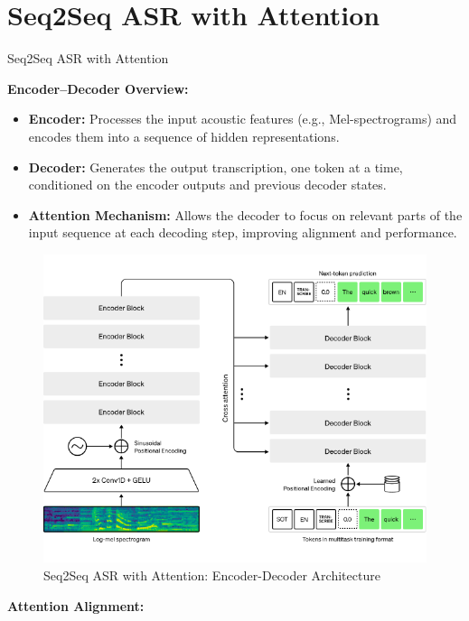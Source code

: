\section{Seq2Seq ASR with Attention}

\begin{frame}[allowframebreaks]{Seq2Seq ASR with Attention}

\textbf{Encoder–Decoder Overview:}
\begin{itemize}
    \item \textbf{Encoder:} Processes the input acoustic features (e.g., Mel-spectrograms) and encodes them into a sequence of hidden representations.
    \item \textbf{Decoder:} Generates the output transcription, one token at a time, conditioned on the encoder outputs and previous decoder states.
    \item \textbf{Attention Mechanism:} Allows the decoder to focus on relevant parts of the input sequence at each decoding step, improving alignment and performance.
\end{itemize}

\begin{figure}[h]
    \centering
    \includegraphics[width=\textwidth,height=0.8\textheight,keepaspectratio]{images/audio-nlp/seq2seq_attention_architecture.png}
    \caption*{Seq2Seq ASR with Attention: Encoder-Decoder Architecture}
\end{figure}

\framebreak

\textbf{Attention Alignment:}


\end{frame}
